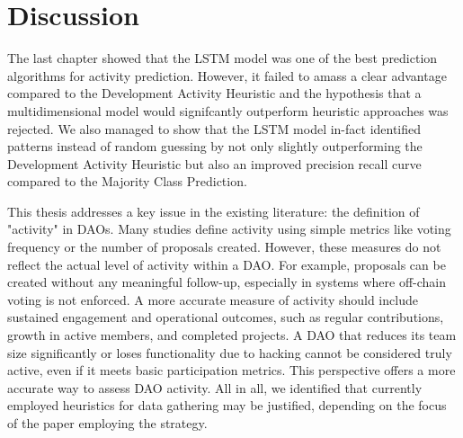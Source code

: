 \chapter{Discussion}

The last chapter showed that the LSTM model was one of the best prediction algorithms for activity prediction.
However, it failed to amass a clear advantage compared to the Development Activity Heuristic and the hypothesis that a multidimensional model would signifcantly outperform heuristic approaches was rejected.
We also managed to show that the LSTM model in-fact identified patterns instead of random guessing by not only slightly outperforming the Development Activity Heuristic but also an improved precision recall curve compared to the Majority Class Prediction.

This thesis addresses a key issue in the existing literature: the definition of "activity" in DAOs. Many studies define activity using simple metrics like voting frequency or the number of proposals created. However, these measures do not reflect the actual level of activity within a DAO. For example, proposals can be created without any meaningful follow-up, especially in systems where off-chain voting is not enforced. A more accurate measure of activity should include sustained engagement and operational outcomes, such as regular contributions, growth in active members, and completed projects. A DAO that reduces its team size significantly or loses functionality due to hacking cannot be considered truly active, even if it meets basic participation metrics. This perspective offers a more accurate way to assess DAO activity.
All in all, we identified that currently employed heuristics for data gathering may be justified, depending on the focus of the paper employing the strategy. 

